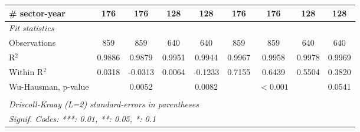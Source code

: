 \documentclass[a4paper]{article}
\begin{document}
\begin{table}[h!]
{\begin{tabular}{lcccccccc}
      \# sector-year                                 & 176            & 176           & 128           & 128                    & 176            & 176                   & 128            & 128\\ 
            \midrule
      \emph{Fit statistics}\\
      Observations                                   & 859            & 859           & 640           & 640                    & 859            & 859                   & 640            & 640\\  
      R$^2$                                          & 0.9886         & 0.9879        & 0.9951        & 0.9944                 & 0.9967         & 0.9958                & 0.9978         & 0.9969\\  
      Within R$^2$                                   & 0.0318         & -0.0313       & 0.0064        & -0.1233                & 0.7155         & 0.6439                & 0.5504         & 0.3820\\  
      Wu-Hausman, p-value                            &                & 0.0052        &               & 0.0082                 &                & $<0.001$  &                            & 0.0541\\ 
      \bottomrule \\ [-0.9em]
      \multicolumn{9}{l}{\emph{Driscoll-Kraay (L=2) standard-errors in parentheses}}\\
      \multicolumn{9}{l}{\emph{Signif. Codes: ***: 0.01, **: 0.05, *: 0.1}}\\
   \end{tabular}
   }
\end{table}
\FloatBarrier
\end{document}

